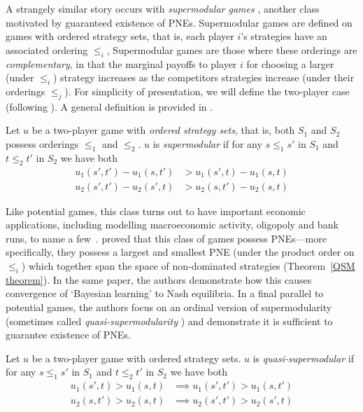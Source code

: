 \documentclass[preprint,authoryear]{elsarticle}
\begin{document}
A strangely similar story occurs with \emph{supermodular games} \citep{topkis1979equilibrium}, another class motivated by guaranteed existence of PNEs. Supermodular games are defined on games with ordered strategy sets, that is, each player $i$'s strategies have an associated ordering $\leq_i$, Supermodular games are those where these orderings are \emph{complementary}, in that the marginal payoffs to player $i$ for choosing a larger (under $\leq_i$) strategy increases as the competitors strategies increase (under their orderings $\leq_j$). For simplicity of presentation, we will define the two-player case (following \cite{berger_two_2007}). A general definition is provided in \cite{milgrom_rationalizability_1990}.
\begin{defn}
    Let $u$ be a two-player game with \emph{ordered strategy sets}, that is, both $S_1$ and $S_2$ possess orderings $\leq_1$ and $\leq_2$. $u$ is \emph{supermodular} if for any $s \leq_1 s'$ in $S_1$ and $t \leq_2 t'$ in $S_2$ we have both
    \begin{align*}
        u_1(s',t') - u_1(s,t') & > u_1(s',t) - u_1(s,t) \\
        u_2(s',t') - u_2(s',t) &> u_2(s,t') - u_2(s,t)
    \end{align*}
\end{defn}

Like potential games, this class turns out to have important economic applications, including modelling macroeconomic activity, oligopoly and bank runs, to name a few~\citep{vives1990nash,milgrom_rationalizability_1990}. \citeauthor{milgrom_rationalizability_1990} proved that this class of games possess PNEs---more specifically, they possess a largest and smallest PNE (under the product order on $\leq_i$) which together span the space of non-dominated strategies (Theorem~\ref{QSM theorem}). In the same paper, the authors demonstrate how this causes convergence of `Bayesian learning' to Nash equilibria. In a final parallel to potential games, the authors focus on an ordinal version of supermodularity (sometimes called \emph{quasi-supermodularity} \citep{berger_two_2007}) and demonstrate it is sufficient to guarantee existence of PNEs.

\begin{defn} \label{def: quasi supermodular}
    Let $u$ be a two-player game with ordered strategy sets. $u$ is \emph{quasi-supermodular} if for any $s \leq_1 s'$ in $S_1$ and $t \leq_2 t'$ in $S_2$ we have both
    \begin{align*}
        u_1(s',t) > u_1(s,t) &\implies u_1(s',t') > u_1(s,t') \\
        u_2(s,t') > u_2(s,t) &\implies u_2(s',t') > u_2(s',t)
    \end{align*}
\end{defn}
\end{document}
